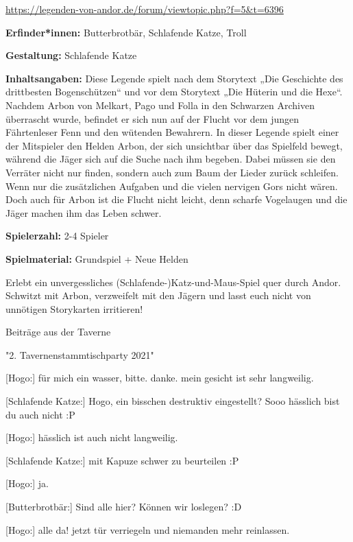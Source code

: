 {\begin{center}
    \url{https://legenden-von-andor.de/forum/viewtopic.php?f=5&t=6396}
\end{center}


\textbf{Erfinder*innen:} Butterbrotbär, Schlafende Katze, Troll

\textbf{Gestaltung:} Schlafende Katze

\textbf{Inhaltsangaben:} Diese Legende spielt nach dem Storytext „Die Geschichte des drittbesten Bogenschützen“ und vor dem Storytext „Die Hüterin und die Hexe“. Nachdem Arbon von Melkart, Pago und Folla in den Schwarzen Archiven überrascht wurde, befindet er sich nun auf der Flucht vor dem jungen Fährtenleser Fenn und den wütenden Bewahrern. In dieser Legende spielt einer der Mitspieler den Helden Arbon, der sich unsichtbar über das Spielfeld bewegt, während die Jäger sich auf die Suche nach ihm begeben. Dabei müssen sie den Verräter nicht nur finden, sondern auch zum Baum der Lieder zurück schleifen. Wenn nur die zusätzlichen Aufgaben und die vielen nervigen Gors nicht wären. Doch auch für Arbon ist die Flucht nicht leicht, denn scharfe Vogelaugen und die Jäger machen ihm das Leben schwer.

\textbf{Spielerzahl:} 2-4 Spieler

\textbf{Spielmaterial:} Grundspiel + Neue Helden

Erlebt ein unvergessliches (Schlafende-)Katz-und-Maus-Spiel quer durch Andor. Schwitzt mit Arbon, verzweifelt mit den Jägern und lasst euch nicht von unnötigen Storykarten irritieren!

\begin{center}
    Beiträge aus der Taverne

    "2. Tavernenstammtischparty 2021"
\end{center}

[Hogo:] für mich ein wasser, bitte. 
danke. mein gesicht ist sehr langweilig.

[Schlafende Katze:] Hogo, ein bisschen destruktiv eingestellt? Sooo hässlich bist du auch nicht :P

[Hogo:] hässlich ist auch nicht langweilig.

[Schlafende Katze:] mit Kapuze schwer zu beurteilen :P

[Hogo:] ja.

[Butterbrotbär:] Sind alle hier? Können wir loslegen? :D

[Hogo:] alle da! jetzt tür verriegeln und niemanden mehr reinlassen.

}
